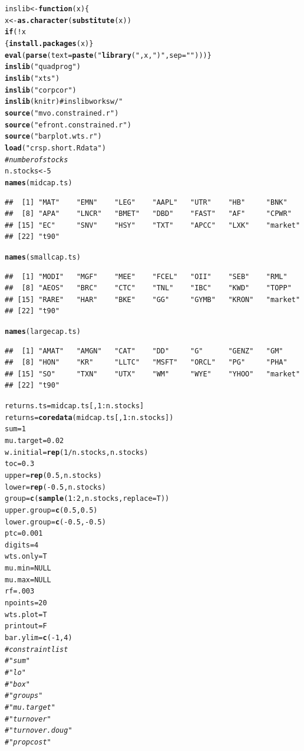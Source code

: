\documentclass{uwstat518}\usepackage[]{graphicx}\usepackage[]{color}
\makeatletter
\newcommand{\hlstr}[1]{\textcolor[rgb]{0.192,0.494,0.8}{#1}}%
\newcommand{\hlcom}[1]{\textcolor[rgb]{0.678,0.584,0.686}{\textit{#1}}}%
\newcommand{\hlkwd}[1]{\textcolor[rgb]{0.737,0.353,0.396}{\textbf{#1}}}%
\newenvironment{kframe}{%
 \def\at@end@of@kframe{}%
 \ifinner\ifhmode%
  \def\at@end@of@kframe{\end{minipage}}%
  \begin{minipage}{\columnwidth}%
 \fi\fi%
 \def\FrameCommand##1{\hskip\@totalleftmargin \hskip-\fboxsep
 \colorbox{shadecolor}{##1}\hskip-\fboxsep
     \hskip-\linewidth \hskip-\@totalleftmargin \hskip\columnwidth}%
 \MakeFramed {\advance\hsize-\width
   \@totalleftmargin\z@ \linewidth\hsize
   \@setminipage}}%
 {\par\unskip\endMakeFramed%
 \at@end@of@kframe}
\newenvironment{knitrout}{}{} %
\makeatother
\begin{document}
\begin{knitrout}
\color{fgcolor}\begin{kframe}
\begin{alltt}
inslib <- \hlkwd{function}(x)\{
	x <-\hlkwd{as.character}(\hlkwd{substitute}(x))
	\hlkwd{if}(!x %
	\{\hlkwd{install.packages}(x)\}
	\hlkwd{eval}(\hlkwd{parse}(text=\hlkwd{paste}(\hlstr{"\hlkwd{library}("},x,\hlstr{")"},sep=\hlstr{""})))\}
\hlkwd{inslib}(\hlstr{"quadprog"})
\hlkwd{inslib}(\hlstr{"xts"})
\hlkwd{inslib}(\hlstr{"corpcor"})
\hlkwd{inslib}(knitr) # inslib works w/ "
\hlkwd{source}(\hlstr{"mvo.constrained.r"})
\hlkwd{source}(\hlstr{"efront.constrained.r"})
\hlkwd{source}(\hlstr{"barplot.wts.r"})
\hlkwd{load}(\hlstr{"crsp.short.Rdata"})
\hlcom{# number of stocks}
n.stocks <- 5
\hlkwd{names}(midcap.ts)
\end{alltt}
\begin{verbatim}
##  [1] "MAT"    "EMN"    "LEG"    "AAPL"   "UTR"    "HB"     "BNK"   
##  [8] "APA"    "LNCR"   "BMET"   "DBD"    "FAST"   "AF"     "CPWR"  
## [15] "EC"     "SNV"    "HSY"    "TXT"    "APCC"   "LXK"    "market"
## [22] "t90"
\end{verbatim}
\begin{alltt}
\hlkwd{names}(smallcap.ts)
\end{alltt}
\begin{verbatim}
##  [1] "MODI"   "MGF"    "MEE"    "FCEL"   "OII"    "SEB"    "RML"   
##  [8] "AEOS"   "BRC"    "CTC"    "TNL"    "IBC"    "KWD"    "TOPP"  
## [15] "RARE"   "HAR"    "BKE"    "GG"     "GYMB"   "KRON"   "market"
## [22] "t90"
\end{verbatim}
\begin{alltt}
\hlkwd{names}(largecap.ts)
\end{alltt}
\begin{verbatim}
##  [1] "AMAT"   "AMGN"   "CAT"    "DD"     "G"      "GENZ"   "GM"    
##  [8] "HON"    "KR"     "LLTC"   "MSFT"   "ORCL"   "PG"     "PHA"   
## [15] "SO"     "TXN"    "UTX"    "WM"     "WYE"    "YHOO"   "market"
## [22] "t90"
\end{verbatim}
\begin{alltt}
returns.ts = midcap.ts[,1:n.stocks]
returns = \hlkwd{coredata}(midcap.ts[,1:n.stocks])
sum=1
mu.target=0.02 
w.initial=\hlkwd{rep}(1/n.stocks,n.stocks) 
toc=0.3
upper=\hlkwd{rep}(0.5,n.stocks)
lower=\hlkwd{rep}(-0.5,n.stocks)
group=\hlkwd{c}(\hlkwd{sample}(1:2,n.stocks,replace=T))
upper.group=\hlkwd{c}(0.5,0.5)
lower.group=\hlkwd{c}(-0.5,-0.5)
ptc=0.001
digits=4
wts.only=T
mu.min = NULL 
mu.max = NULL 
rf = .003
npoints = 20
wts.plot = T 
printout = F
bar.ylim = \hlkwd{c}(-1,4)
\hlcom{# constraint list}
\hlcom{#"sum" }
\hlcom{#"lo"}
\hlcom{#"box"}
\hlcom{#"groups"}
\hlcom{#"mu.target"}
\hlcom{#"turnover"}
\hlcom{#"turnover.doug"}
\hlcom{#"propcost"}
\end{alltt}
\end{kframe}
\end{knitrout}
\end{document}
